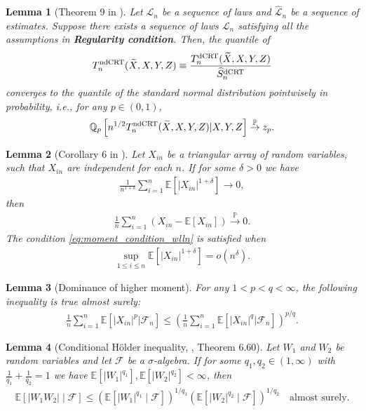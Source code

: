 \documentclass[12pt]{article}
\newtheorem{lemma}{Lemma}
\theoremstyle{definition}
\def\P{\mathbb{P}}
\def\P{\mathbb{P}}
\newcommand{\E}{\mathbb E}								%
\renewcommand{\P}{\mathbb{P}}							%
\newcommand{\Q}{\mathbb{Q}}								%
\newcommand{\convp}{\overset{\mathbb{P}}{\rightarrow}}             %
\newcommand{\srx}{X}									%
\newcommand{\srz}{Z}									%
\newcommand{\srxk}{\widetilde X}						%
\newcommand{\sry}{Y}									%
\newcommand{\law}{\mathcal L}							%
\newcommand{\lawhat}{\widehat{\mathcal L}}				%
\newcommand{\dCRT}{\textnormal{dCRT}} 					%
\newcommand{\ndCRThat}{\textnormal{ndCRT}}	%
\begin{document}
\begin{lemma}[Theorem 9 in \cite{Niu2022a}]\label{lem:quantile_convergence_ptwise}
	Let $\law_n$ be a sequence of laws and $\lawhat_n$ be a sequence of estimates. Suppose  there exists a sequence of laws $\law_n$ satisfying all the assumptions in \textbf{Regularity condition}. Then, the quantile of 
  \begin{align}\label{eq:normalized_dcrt_stats}
    T_n^{\ndCRThat}(\srxk,\srx,\sry,\srz)\equiv \frac{T_n^{\dCRT}(\srxk,\srx,\sry,\srz)}{\widehat S_n^{\dCRT}}
  \end{align}
  converges to the quantile of the standard normal distribution pointwisely in probability, i.e., for any $p\in(0,1)$,
	\begin{align*}
		\Q_{p}\left[n^{1/2}T_n^{\ndCRThat}(\srxk,\srx,\sry,\srz)|\srx,\sry,\srz\right]\convp z_{p}.
	\end{align*}
\end{lemma}

\begin{lemma}[Corollary 6 in \cite{Niu2022a}]\label{lem:wlln}
  Let $X_{in}$ be a triangular array of random variables, such that $X_{in}$ are independent for each $n$. If for some $\delta>0$ we have 
  \begin{align}\label{eq:moment_condition_wlln}
    \frac{1}{n^{1+\delta}}\sum_{i=1}^n \E[|X_{in}|^{1+\delta}]\rightarrow 0,
  \end{align}
  then 
  \begin{align*}
    \frac{1}{n}\sum_{i=1}^n (X_{in}-\E[X_{in}])\overset{\P}{\rightarrow}0.
  \end{align*}
  The condition \eqref{eq:moment_condition_wlln} is satisfied when 
  \begin{align*}
    \sup_{1\leq i\leq n}\E[|X_{in}|^{1+\delta}]=o(n^\delta).
  \end{align*}
\end{lemma}

\begin{lemma}[Dominance of higher moment]\label{lem:moment_dominance}
  For any $1<p<q<\infty$, the following inequality is true almost surely:
  \begin{align*}
    \frac{1}{n}\sum_{i=1}^n \E[|X_{in}|^{p}|\mathcal{F}_n]\leq \left(\frac{1}{n}\sum_{i=1}^n \E[|X_{in}|^{q}|\mathcal{F}_n]\right)^{p/q}.
  \end{align*}
\end{lemma}


\begin{lemma}[Conditional H\"older inequality, \cite{Swanson2019}, Theorem 6.60]\label{lem:cond_holder}
	Let $W_1$ and $W_2$ be random variables and let $\mathcal F$ be a $\sigma$-algebra. If for some $q_1, q_2 \in (1,\infty)$ with $\frac{1}{q_1} + \frac{1}{q_2} = 1$ we have $\E[|W_1|^{q_1}], \E[|W_2|^{q_2}] < \infty$, then
	\begin{align*}
		\E[|W_1 W_2| \mid \mathcal F] \leq (\E[|W_1|^{q_1} \mid \mathcal F])^{1/q_1}(\E[|W_2|^{q_2} \mid \mathcal F])^{1/q_2} \quad \text{almost surely}.
	\end{align*}
\end{lemma}
\end{document}

